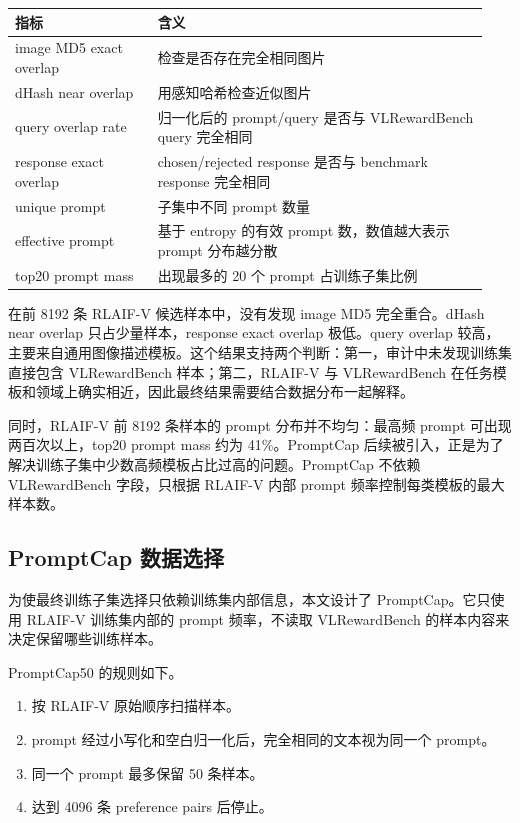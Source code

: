 \documentclass[11pt,a4paper]{ctexart}
\begin{document}
\begin{center}\small
\begin{longtable}{p{0.29\linewidth} p{0.65\linewidth}}
\toprule
指标 & 含义 \\
\midrule
image MD5 exact overlap & 检查是否存在完全相同图片 \\
dHash near overlap & 用感知哈希检查近似图片 \\
query overlap rate & 归一化后的 prompt/query 是否与 VLRewardBench query 完全相同 \\
response exact overlap & chosen/rejected response 是否与 benchmark response 完全相同 \\
unique prompt & 子集中不同 prompt 数量 \\
effective prompt & 基于 entropy 的有效 prompt 数，数值越大表示 prompt 分布越分散 \\
top20 prompt mass & 出现最多的 20 个 prompt 占训练子集比例 \\
\bottomrule
\end{longtable}\end{center}

在前 8192 条 RLAIF-V 候选样本中，没有发现 image MD5 完全重合。dHash near overlap 只占少量样本，response exact overlap 极低。query overlap 较高，主要来自通用图像描述模板。这个结果支持两个判断：第一，审计中未发现训练集直接包含 VLRewardBench 样本；第二，RLAIF-V 与 VLRewardBench 在任务模板和领域上确实相近，因此最终结果需要结合数据分布一起解释。

同时，RLAIF-V 前 8192 条样本的 prompt 分布并不均匀：最高频 prompt 可出现两百次以上，top20 prompt mass 约为 41\%。PromptCap 后续被引入，正是为了解决训练子集中少数高频模板占比过高的问题。PromptCap 不依赖 VLRewardBench 字段，只根据 RLAIF-V 内部 prompt 频率控制每类模板的最大样本数。

\subsection{PromptCap 数据选择}

为使最终训练子集选择只依赖训练集内部信息，本文设计了 PromptCap。它只使用 RLAIF-V 训练集内部的 prompt 频率，不读取 VLRewardBench 的样本内容来决定保留哪些训练样本。

PromptCap50 的规则如下。

\begin{enumerate}
\item 按 RLAIF-V 原始顺序扫描样本。
\item prompt 经过小写化和空白归一化后，完全相同的文本视为同一个 prompt。
\item 同一个 prompt 最多保留 50 条样本。
\item 达到 4096 条 preference pairs 后停止。
\end{enumerate}
\end{document}
